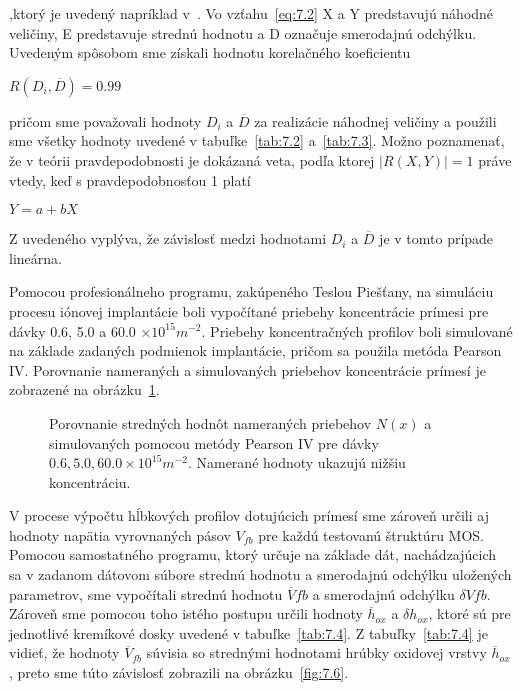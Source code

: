 ,ktorý je uvedený napríklad v~\cite{7.1}. Vo vzťahu~\ref{eq:7.2} X a Y
predstavujú náhodné veličiny, E predstavuje strednú hodnotu a D
označuje smerodajnú odchýlku. Uvedeným spôsobom sme získali hodnotu
korelačného koeficientu

\centerline{$R(D_{i}, \overline{D}) = 0.99$}

pričom sme považovali hodnoty $D_{i}$ a $\overline{D}$ za realizácie
náhodnej veličiny a použili sme všetky hodnoty uvedené v
tabuľke~\ref{tab:7.2} a~\ref{tab:7.3}. Možno poznamenať, že v teórii
pravdepodobnosti je dokázaná veta, podľa ktorej $\rvert R(X,Y)\rvert =
1$ práve vtedy, keď s pravdepodobnosťou 1 platí

\centerline{$Y = a + b X$}

Z uvedeného vyplýva, že závislosť medzi hodnotami $D_{i}$ a $\overline
D$ je v tomto prípade lineárna.

Pomocou profesionálneho programu, zakúpeného Teslou Piešťany, na
simuláciu procesu iónovej implantácie boli vypočítané priebehy
koncentrácie prímesi pre dávky 0.6, 5.0 a 60.0 $\times10^{15}m^{-2}$.
Priebehy koncentračných profilov boli simulované na základe zadaných
podmienok implantácie, pričom sa použila metóda Pearson IV\@.
Porovnanie nameraných a simulovaných priebehov koncentrácie prímesí je
zobrazené na obrázku~\ref{fig:7.5}.

\begin{figure}[h!]\centering
  \begin{minipage}[c]{\myfiguresize}
    \begin{center}
      
    \end{center}
    \caption[Porovnanie stredných hodnôt nameraných priebehov $N(x)$ a
      simulovaných pomocou metódy Pearson IV]{Porovnanie stredných
      hodnôt nameraných priebehov $N(x)$ a simulovaných pomocou metódy
      Pearson IV pre dávky $0.6, 5.0, 60.0 \times 10^{15}
      m^{-2}$. Namerané hodnoty ukazujú nižšiu
      koncentráciu.}\label{fig:7.5}
  \end{minipage}
\end{figure}

V procese výpočtu hĺbkových profilov dotujúcich prímesí sme zároveň
určili aj hodnoty napätia vyrovnaných pásov $V_{fb}$ pre každú
testovanú štruktúru MOS\@. Pomocou samostatného programu, ktorý určuje
na základe dát, nachádzajúcich sa v zadanom dátovom súbore strednú
hodnotu a smerodajnú odchýlku uložených parametrov, sme vypočítali
strednú hodnotu $\overline V{fb}$ a smerodajnú odchýlku $\delta
V{fb}$. Zároveň sme pomocou toho istého postupu určili hodnoty
$\overline h_{ox}$ a $\delta h_{ox}$, ktoré sú pre jednotlivé
kremíkové dosky uvedené v tabuľke~\ref{tab:7.4}. Z
tabuľky~\ref{tab:7.4} je vidieť, že hodnoty $\overline V_{fb}$ súvisia
so strednými hodnotami hrúbky oxidovej vrstvy $\overline h_{ox}$,
preto sme túto závislosť zobrazili na obrázku~\ref{fig:7.6}.

